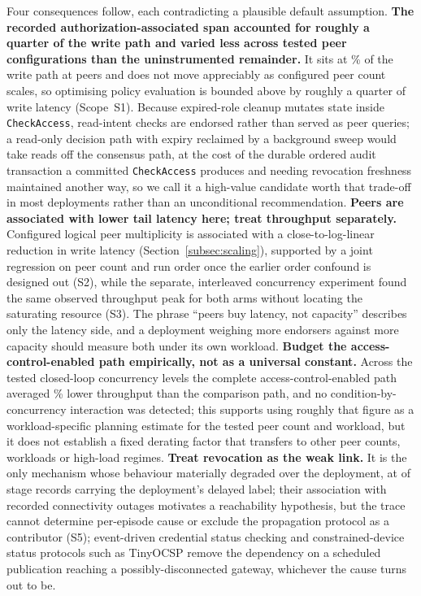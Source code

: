 \documentclass[a4paper,fleqn]{cas-dc}
\begin{document}
Four consequences follow, each contradicting a plausible default
assumption. \textbf{The recorded authorization-associated span accounted
for roughly a quarter of the write path and varied less across tested
peer configurations than the uninstrumented remainder.} It sits at
\PartAccessPct\% of the write path at \ScaleMinPeers{} peers and does not
move appreciably as configured peer count scales, so optimising policy
evaluation is bounded above by roughly a quarter of write latency
(Scope~S1). Because expired-role cleanup
mutates state inside \texttt{CheckAccess}, read-intent checks are endorsed
rather than served as peer queries; a read-only decision path with expiry
reclaimed by a background sweep would take reads off the consensus path, at
the cost of the durable ordered audit transaction a committed
\texttt{CheckAccess} produces and needing revocation freshness maintained
another way, so we call it a high-value candidate worth that trade-off in
most deployments rather than an unconditional recommendation.
\textbf{Peers are associated with lower tail latency here; treat
throughput separately.} Configured logical peer multiplicity is associated
with a close-to-log-linear reduction in write latency
(Section~\ref{subsec:scaling}), supported by a joint regression on peer
count and run order once the earlier order confound is designed out
(S2), while the separate, interleaved concurrency experiment found the
same observed throughput peak for both arms without locating the
saturating resource (S3). The phrase ``peers buy latency, not capacity'' describes
only the latency side, and a deployment weighing more endorsers against
more capacity should measure both under its own workload.
\textbf{Budget the access-control-enabled path empirically, not as a
universal constant.} Across the tested closed-loop concurrency levels the
complete access-control-enabled path averaged \OverheadMeanPct\% lower
throughput than the comparison path, and no condition-by-concurrency
interaction was detected; this supports using roughly that figure as a
workload-specific planning estimate for the tested peer count and
workload, but it does not establish a fixed derating factor that transfers
to other peer counts, workloads or high-load regimes. \textbf{Treat
revocation as the weak link.} It is the only
mechanism whose behaviour materially degraded over the deployment, at
\RevDelayed{} of \RevEvents{} stage records carrying the deployment's
delayed label; their association with recorded connectivity outages
motivates a reachability hypothesis, but the trace cannot determine
per-episode cause or exclude the propagation protocol as a contributor
(S5); event-driven credential status checking
\cite{w3c_vc_status_list} and constrained-device status protocols such as
TinyOCSP \cite{fedrecheski2023tinyocsp} remove the dependency on a
scheduled publication reaching a possibly-disconnected gateway, whichever
the cause turns out to be.
\end{document}
